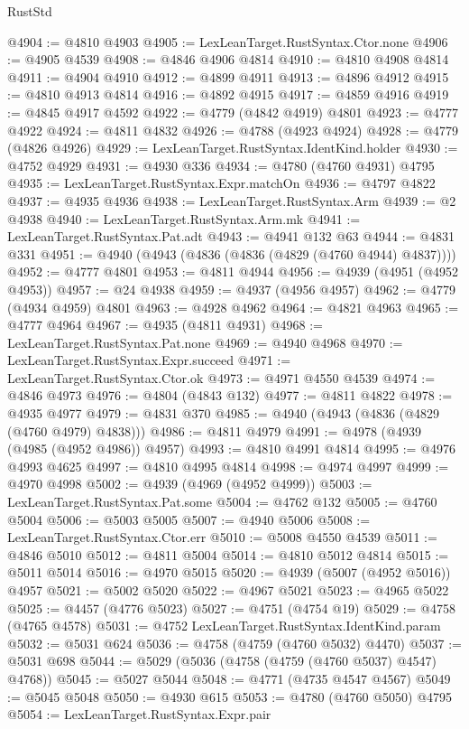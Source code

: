 \begin{lexlean}{RustStd}
\begin{coremodule}
@4904 := @4810 @4903
@4905 := LexLeanTarget.RustSyntax.Ctor.none
@4906 := @4905 @4539
@4908 := @4846 @4906 @4814
@4910 := @4810 @4908 @4814
@4911 := @4904 @4910
@4912 := @4899 @4911
@4913 := @4896 @4912
@4915 := @4810 @4913 @4814
@4916 := @4892 @4915
@4917 := @4859 @4916
@4919 := @4845 @4917 @4592
@4922 := @4779 (@4842 @4919) @4801
@4923 := @4777 @4922
@4924 := @4811 @4832
@4926 := @4788 (@4923 @4924)
@4928 := @4779 (@4826 @4926)
@4929 := LexLeanTarget.RustSyntax.IdentKind.holder
@4930 := @4752 @4929
@4931 := @4930 @336
@4934 := @4780 (@4760 @4931) @4795
@4935 := LexLeanTarget.RustSyntax.Expr.matchOn
@4936 := @4797 @4822
@4937 := @4935 @4936
@4938 := LexLeanTarget.RustSyntax.Arm
@4939 := @2 @4938
@4940 := LexLeanTarget.RustSyntax.Arm.mk
@4941 := LexLeanTarget.RustSyntax.Pat.adt
@4943 := @4941 @132 @63
@4944 := @4831 @331
@4951 := @4940 (@4943 (@4836 (@4836 (@4829 (@4760 @4944) @4837))))
@4952 := @4777 @4801
@4953 := @4811 @4944
@4956 := @4939 (@4951 (@4952 @4953))
@4957 := @24 @4938
@4959 := @4937 (@4956 @4957)
@4962 := @4779 (@4934 @4959) @4801
@4963 := @4928 @4962
@4964 := @4821 @4963
@4965 := @4777 @4964
@4967 := @4935 (@4811 @4931)
@4968 := LexLeanTarget.RustSyntax.Pat.none
@4969 := @4940 @4968
@4970 := LexLeanTarget.RustSyntax.Expr.succeed
@4971 := LexLeanTarget.RustSyntax.Ctor.ok
@4973 := @4971 @4550 @4539
@4974 := @4846 @4973
@4976 := @4804 (@4843 @132)
@4977 := @4811 @4822
@4978 := @4935 @4977
@4979 := @4831 @370
@4985 := @4940 (@4943 (@4836 (@4829 (@4760 @4979) @4838)))
@4986 := @4811 @4979
@4991 := @4978 (@4939 (@4985 (@4952 @4986)) @4957)
@4993 := @4810 @4991 @4814
@4995 := @4976 @4993 @4625
@4997 := @4810 @4995 @4814
@4998 := @4974 @4997
@4999 := @4970 @4998
@5002 := @4939 (@4969 (@4952 @4999))
@5003 := LexLeanTarget.RustSyntax.Pat.some
@5004 := @4762 @132
@5005 := @4760 @5004
@5006 := @5003 @5005
@5007 := @4940 @5006
@5008 := LexLeanTarget.RustSyntax.Ctor.err
@5010 := @5008 @4550 @4539
@5011 := @4846 @5010
@5012 := @4811 @5004
@5014 := @4810 @5012 @4814
@5015 := @5011 @5014
@5016 := @4970 @5015
@5020 := @4939 (@5007 (@4952 @5016)) @4957
@5021 := @5002 @5020
@5022 := @4967 @5021
@5023 := @4965 @5022
@5025 := @4457 (@4776 @5023)
@5027 := @4751 (@4754 @19)
@5029 := @4758 (@4765 @4578)
@5031 := @4752 LexLeanTarget.RustSyntax.IdentKind.param
@5032 := @5031 @624
@5036 := @4758 (@4759 (@4760 @5032) @4470)
@5037 := @5031 @698
@5044 := @5029 (@5036 (@4758 (@4759 (@4760 @5037) @4547) @4768))
@5045 := @5027 @5044
@5048 := @4771 (@4735 @4547 @4567)
@5049 := @5045 @5048
@5050 := @4930 @615
@5053 := @4780 (@4760 @5050) @4795
@5054 := LexLeanTarget.RustSyntax.Expr.pair

\end{coremodule}
\end{lexlean}
